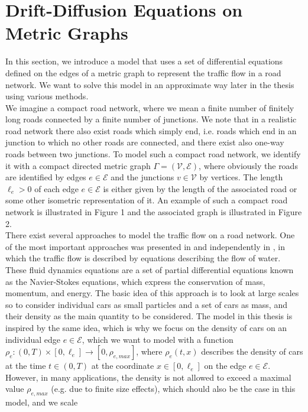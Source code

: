 \section{Drift-Diffusion Equations on Metric Graphs}
\label{ch1:sec2}

In this section, we introduce a model that uses a set of differential equations defined on the edges of a metric graph to represent the traffic flow in a road network. We want to solve this model in an approximate way later in the thesis using various methods. \\
We imagine a compact road network, where we mean a finite number of finitely long roads connected by a finite number of junctions. We note that in a realistic road network there also exist roads which simply end, i.e. roads which end in an junction to which no other roads are connected, and there exist also one-way roads between two junctions. To model such a compact road network, we identify it with a compact directed metric graph $\Gamma = (\mathcal{V}, \mathcal{E})$, where obviously the roads are identified by edges $e \in \mathcal{E}$ and the junctions $v \in \mathcal{V}$ by vertices. The length $\ell_e > 0$ of each edge $e \in \mathcal{E}$ is either given by the length of the associated road or some other isometric representation of it. An example of such a compact road network is illustrated in Figure 1 and the associated graph is illustrated in Figure 2. \\

There exist several approaches to model the traffic flow on a road network. One of the most important approaches was presented in \cite{LighthillWhitham:1955} and independently in \cite{Richards:1956}, in which the traffic flow is described by equations describing the flow of water. These fluid dynamics equations are a set of partial differential equations known as the Navier-Stokes equations, which express the conservation of mass, momentum, and energy. The basic idea of this approach is to look at large scales so to consider individual cars as small particles and a set of cars as mass, and their density as the main quantity to be considered. The model in this thesis is inspired by the same idea, which is why we focus on the density of cars on an individual edge $e \in \mathcal{E}$, which we want to model with a function $\rho_e \colon (0, T) \times [0, \ell_e] \to [0, \rho_{e, max}]$, where $\rho_e (t,x)$ describes the density of cars at the time $t \in (0, T)$ at the coordinate $x \in [0, \ell_e]$ on the edge $e \in \mathcal{E}$. However, in many applications, the density is not allowed to exceed a maximal value $\rho_{e, max}$ (e.g. due to finite size effects), which should also be the case in this model, and we scale 

